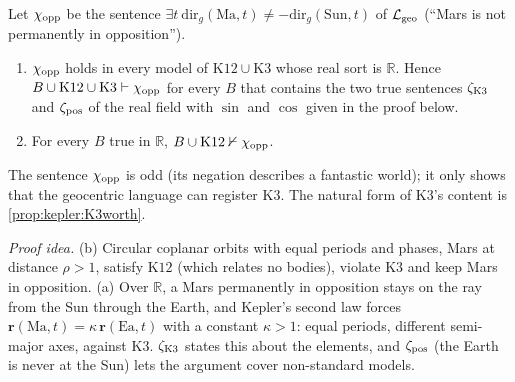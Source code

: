 \begin{proposition}\label{prop:kepler:geo}
Let $\chi_{\rm opp}$ be the sentence $\exists t\ \mathrm{dir}_g(\mathrm{Ma},t)\ne-\mathrm{dir}_g(\mathrm{Sun},t)$ of $\mathcal L_{\rm geo}$ (``Mars is not permanently in opposition'').
\begin{enumerate}[label=(\alph*),leftmargin=*,itemsep=0pt]
\item $\chi_{\rm opp}$ holds in every model of $\mathrm{K12}\cup\mathrm{K3}$ whose real sort is $\mathbb R$. Hence $B\cup\mathrm{K12}\cup\mathrm{K3}\vdash\chi_{\rm opp}$ for every $B$ that contains the two true sentences $\zeta_{\rm K3}$ and $\zeta_{\rm pos}$ of the real field with $\sin$ and $\cos$ given in the proof below.
\item For every $B$ true in $\mathbb R$, $B\cup\mathrm{K12}\nvdash\chi_{\rm opp}$.
\end{enumerate}
\end{proposition}

The sentence $\chi_{\rm opp}$ is odd (its negation describes a fantastic world); it only shows that the geocentric language can register $\mathrm{K3}$. The natural form of $\mathrm{K3}$'s content is \cref{prop:kepler:K3worth}.

\emph{Proof idea.} (b) Circular coplanar orbits with equal periods and phases, Mars at distance $\rho>1$, satisfy $\mathrm{K12}$ (which relates no bodies), violate $\mathrm{K3}$ and keep Mars in opposition. (a) Over $\mathbb R$, a Mars permanently in opposition stays on the ray from the Sun through the Earth, and Kepler's second law forces $\mathbf r(\mathrm{Ma},t)=\kappa\,\mathbf r(\mathrm{Ea},t)$ with a constant $\kappa>1$: equal periods, different semi-major axes, against $\mathrm{K3}$. $\zeta_{\rm K3}$ states this about the elements, and $\zeta_{\rm pos}$ (the Earth is never at the Sun) lets the argument cover non-standard models.

